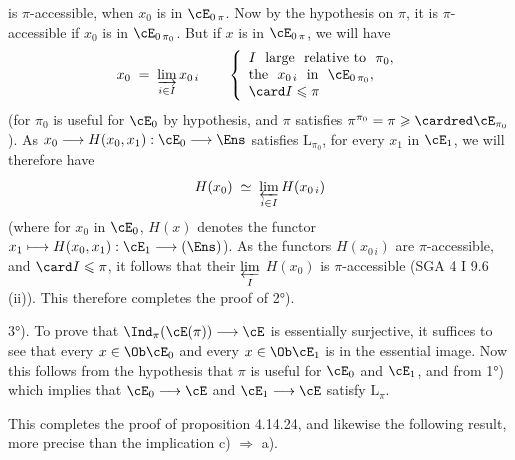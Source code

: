 \setcounter{footnote}{174}


is $\pi$-accessible, when $x_0$ is in $\cE_{0\,\pi}$. Now by the hypothesis on $\pi$, it is $\pi$-accessible if $x_0$ is in $\cE_{0\,\pi_0}$. But if $x$ is in $\cE_{0\,\pi}$, we will have %
\[
x_0 \;=\; \varinjlim_{i\in I} x_{0\,i} \qquad
\left\{
\begin{array}{l}
I\ \ \text{large}\ \ \text{relative to}\ \ \pi_0,\\
\text{the}\ \ x_{0\,i}\ \ \text{in}\ \ \cE_{0\,\pi_0},\\
\card I \leqslant \pi
\end{array}
\right.
\]
(for $\pi_0$ is useful for $\cE_0$ by hypothesis, and $\pi$ satisfies $\pi^{\pi_0} = \pi \geqslant \cardred \cE_{\pi_0}$). As $x_0 \longrightarrow H(x_0,x_1) : \cE_0 \longrightarrow \Ens$ satisfies $\mathrm{L}_{\pi_0}$, for every $x_1$ in $\cE_1$, we will therefore have %
\[
H(x_0) \;\simeq\; \varprojlim_{i\in I} H(x_{0\,i})
\]
(where for $x_0$ in $\cE_0$, $H(x)$ denotes the functor $x_1 \longmapsto H(x_0,x_1) : \cE_1 \longrightarrow (\Ens)$). As %
the functors $H(x_{0\,i})$ are $\pi$-accessible, and $\card I \leqslant \pi$, it follows that their $\varprojlim\limits_{I}$ $H(x_0)$ is $\pi$-accessible (SGA 4 I 9.6 (ii)). This therefore completes the proof of 2°).

3°). To prove that $\Ind_\pi(\cE(\pi)) \longrightarrow \cE$ is essentially surjective, it suffices to see that every $x \in \Ob\cE_0$ and every $x \in \Ob\cE_1$
is in the essential image. Now this follows from the hypothesis that $\pi$ is useful for $\cE_0$ and $\cE_1$, and from 1°) which implies that $\cE_0 \longrightarrow \cE$ and $\cE_1 \longrightarrow \cE$ satisfy $\mathrm{L}_\pi$.

This completes the proof of proposition 4.14.24, and likewise the following result, more precise than the implication c) $\Longrightarrow$ a).

